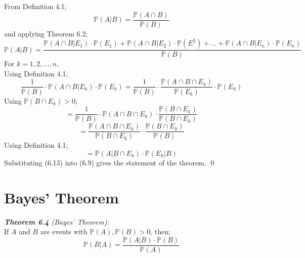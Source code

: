 \documentclass{report}
\newenvironment{cframed2}[1][PineGreen]
  {\begin{tcolorbox}[colframe=#1,colback=white]}
  {\end{tcolorbox}}
\newenvironment{cframedp}[1][Black]
  {\begin{tcolorbox}[colframe=#1,colback=white]}
  {\end{tcolorbox}}
\begin{document}
\begin{cframedp}
From Definition 4.1;
\begin{equation}
    \mathbb{P}(A|B) = \frac{\mathbb{P}(A\cap B)}{\mathbb{P}(B)}
\end{equation}
and applying Theorem 6.2;
\begin{equation}
    \mathbb{P}(A|B) = \frac{\mathbb{P}(A \cap B|E_1) \cdot \mathbb{P}(E_1) + \mathbb{P}(A \cap B|E_2) \cdot \mathbb{P}(E^2) + ... + \mathbb{P}(A \cap B|E_n) \cdot \mathbb{P}(E_n)}{\mathbb{P}(B)}
\end{equation}
For $k = 1,2,...,n$,\\
Using Definition 4.1;
\begin{equation}
    \frac{1}{\mathbb{P}(B)} \cdot \mathbb{P}(A \cap B|E_k) \cdot \mathbb{P}(E_k) = \frac{1}{\mathbb{P}(B)} \cdot \frac{\mathbb{P}(A \cap B \cap E_k)}{\mathbb{P}(E_k)} \cdot \mathbb{P}(E_k)
\end{equation}
Using $\mathbb{P}(B \cap E_k) > 0$;
\begin{equation}
    = \frac{1}{\mathbb{P}(B)} \cdot \mathbb{P}(A \cap B \cap E_k) \cdot \frac{\mathbb{P}(B \cap E_k)}{\mathbb{P}(B \cap E_k)}
\end{equation}
\begin{equation}
    = \frac{\mathbb{P}(A \cap B \cap E_k)}{\mathbb{P}(B \cap E_k)} \cdot \frac{\mathbb{P}(B \cap E_k)}{\mathbb{P}(B)}
\end{equation}
Using Definition 4.1;
\begin{equation}
    = \mathbb{P}(A|B \cap E_k) \cdot \mathbb{P}(E_k|B)
\end{equation}
Substituting (6.13) into (6.9) gives the statement of the theorem.
\qed
\end{cframedp}
\pagebreak
\section{Bayes' Theorem}

\begin{cframed2}
\textcolor{PineGreen}{\textit{\textbf{Theorem 6.4} (Bayes' Theorem):}\\
If $A$ and $B$ are events with $\mathbb{P}(A), \mathbb{P}(B) > 0$, then;
\begin{equation}
    \mathbb{P}(B|A)= \frac{\mathbb{P}(A|B) \cdot \mathbb{P}(B)}{\mathbb{P}(A)}
\end{equation}}
\end{cframed2}
\end{document}
